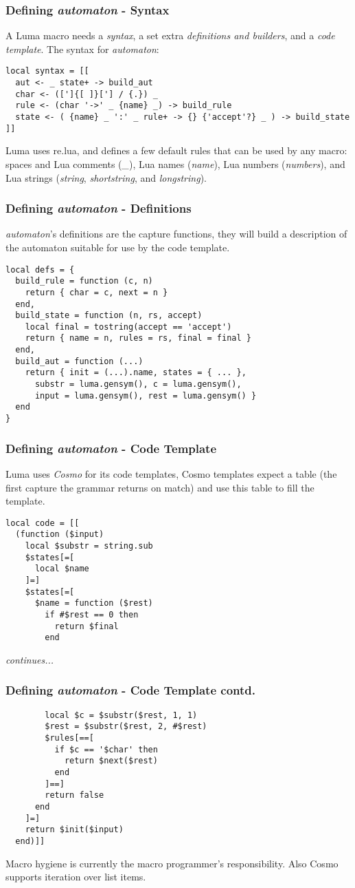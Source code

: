 \documentclass{beamer}
\begin{document}
\begin{frame}[fragile]
\frametitle{Defining \emph{automaton} - Syntax}
A Luma macro needs a \emph{syntax}, a set extra \emph{definitions and builders}, and
a \emph{code template}. The syntax for \emph{automaton}:
\begin{verbatim}
local syntax = [[
  aut <- _ state+ -> build_aut
  char <- ([']{[ ]}['] / {.}) _
  rule <- (char '->' _ {name} _) -> build_rule 
  state <- ( {name} _ ':' _ rule+ -> {} {'accept'?} _ ) -> build_state
]]
\end{verbatim}
Luma uses re.lua, and defines a few default rules that can be used by
any macro: spaces and Lua comments (\emph{\_}), Lua names (\emph{name}),
Lua numbers (\emph{numbers}), and Lua strings (\emph{string}, \emph{shortstring},
and \emph{longstring}).
\end{frame}

\begin{frame}[fragile]
\frametitle{Defining \emph{automaton} - Definitions}
\emph{automaton}'s definitions are the capture functions, they will build a description
of the automaton suitable for use by the code template.
\begin{verbatim}
local defs = {
  build_rule = function (c, n)
    return { char = c, next = n }
  end,
  build_state = function (n, rs, accept)
    local final = tostring(accept == 'accept')
    return { name = n, rules = rs, final = final }
  end,
  build_aut = function (...)
    return { init = (...).name, states = { ... }, 
      substr = luma.gensym(), c = luma.gensym(),
      input = luma.gensym(), rest = luma.gensym() }
  end
}
\end{verbatim}
\end{frame}

\begin{frame}[fragile]
\frametitle{Defining \emph{automaton} - Code Template}
Luma uses \emph{Cosmo} for its code templates, Cosmo templates expect a table (the first
capture the grammar returns on match) and use this table to fill the template.
\begin{verbatim}
local code = [[
  (function ($input)
    local $substr = string.sub
    $states[=[
      local $name
    ]=]
    $states[=[
      $name = function ($rest)
        if #$rest == 0 then
          return $final
        end
\end{verbatim}
\emph{continues...}
\end{frame}

\begin{frame}[fragile]
\frametitle{Defining \emph{automaton} - Code Template contd.}
\begin{verbatim}
        local $c = $substr($rest, 1, 1)
        $rest = $substr($rest, 2, #$rest)
        $rules[==[
          if $c == '$char' then
            return $next($rest)
          end
        ]==]
        return false
      end
    ]=]
    return $init($input)
  end)]]
\end{verbatim}
Macro hygiene is currently the macro programmer's responsibility. Also Cosmo
supports iteration over list items.
\end{frame}
\end{document}
